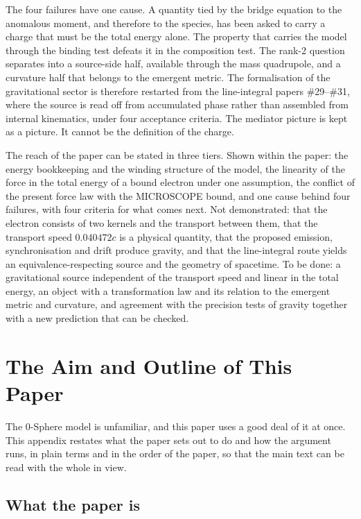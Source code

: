 \documentclass[%
 reprint, amsmath,amssymb, aps, prb, ]{revtex4-2}
\numberwithin{equation}{section}
\begin{document}
The four failures have one cause. A quantity tied by the bridge equation to the anomalous moment, and therefore to the species, has been asked to carry a charge that must be the total energy alone. The property that carries the model through the binding test defeats it in the composition test. The rank-2 question separates into a source-side half, available through the mass quadrupole, and a curvature half that belongs to the emergent metric. The formalisation of the gravitational sector is therefore restarted from the line-integral papers \#29--\#31, where the source is read off from accumulated phase rather than assembled from internal kinematics, under four acceptance criteria. The mediator picture is kept as a picture. It cannot be the definition of the charge.

The reach of the paper can be stated in three tiers. Shown within the paper: the energy bookkeeping and the winding structure of the model, the linearity of the force in the total energy of a bound electron under one assumption, the conflict of the present force law with the MICROSCOPE bound, and one cause behind four failures, with four criteria for what comes next. Not demonstrated: that the electron consists of two kernels and the transport between them, that the transport speed $0.040472c$ is a physical quantity, that the proposed emission, synchronisation and drift produce gravity, and that the line-integral route yields an equivalence-respecting source and the geometry of spacetime. To be done: a gravitational source independent of the transport speed and linear in the total energy, an object with a transformation law and its relation to the emergent metric and curvature, and agreement with the precision tests of gravity together with a new prediction that can be checked.

\appendix

\section{The Aim and Outline of This Paper}
\label{app:aim}

The 0-Sphere model is unfamiliar, and this paper uses a good deal of it at once. This appendix restates what the paper sets out to do and how the argument runs, in plain terms and in the order of the paper, so that the main text can be read with the whole in view.

\subsection{What the paper is}
\end{document}
